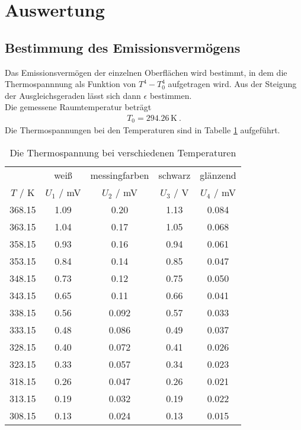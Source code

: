 \section{Auswertung}
\label{sec:Auswertung}

\subsection{Bestimmung des Emissionsvermögens}
Das Emissionsvermögen der einzelnen Oberflächen wird bestimmt, in dem die Thermospannnung als Funktion von $T^4 - T_0^4$ aufgetragen wird. Aus der Steigung der Ausgleichsgeraden lässt sich dann $\epsilon$ bestimmen. \\
Die gemessene Raumtemperatur beträgt
\begin{align*}
  T_0 = 294.26 \, \text{K} \ .
\end{align*}
Die Thermospannungen bei den Temperaturen sind in Tabelle \ref{tab:Daten} aufgeführt.
\begin{table}
  \centering
  \begin{tabular}{c c c c c}
    \toprule
    	& \multicolumn{1}{c}{weiß} & \multicolumn{1}{c}{messingfarben} &	\multicolumn{1}{c}{schwarz} & \multicolumn{1}{c}{glänzend} \\
    $T$ / K & $U_\text{1}$ / mV & $U_\text{2}$ / mV & $U_\text{3}$ / V & $U_\text{4}$ / mV \\
    \midrule
      368.15	&  1.09	&  0.20	 & 1.13  & 0.084 \\
      363.15	&  1.04	&  0.17	 & 1.05  & 0.068 \\
      358.15	&  0.93	&  0.16	 & 0.94  & 0.061 \\
      353.15	&  0.84	&  0.14	 & 0.85  & 0.047 \\
      348.15	&  0.73	&  0.12	 & 0.75  & 0.050 \\
      343.15	&  0.65	&  0.11	 & 0.66  & 0.041 \\
      338.15	&  0.56 &  0.092 & 0.57  & 0.033 \\
      333.15	&  0.48	&  0.086 & 0.49  & 0.037 \\
      328.15	&  0.40	&  0.072 & 0.41  & 0.026 \\
      323.15	&  0.33	&  0.057 & 0.34  & 0.023 \\
      318.15	&  0.26	&  0.047 & 0.26  & 0.021 \\
      313.15	&  0.19	&  0.032 & 0.19  & 0.022 \\
      308.15	&  0.13	&  0.024 & 0.13  & 0.015 \\
    \bottomrule
  \end{tabular}
  \caption{Die Thermospannung bei verschiedenen Temperaturen}
  \label{tab:Daten}
\end{table}

